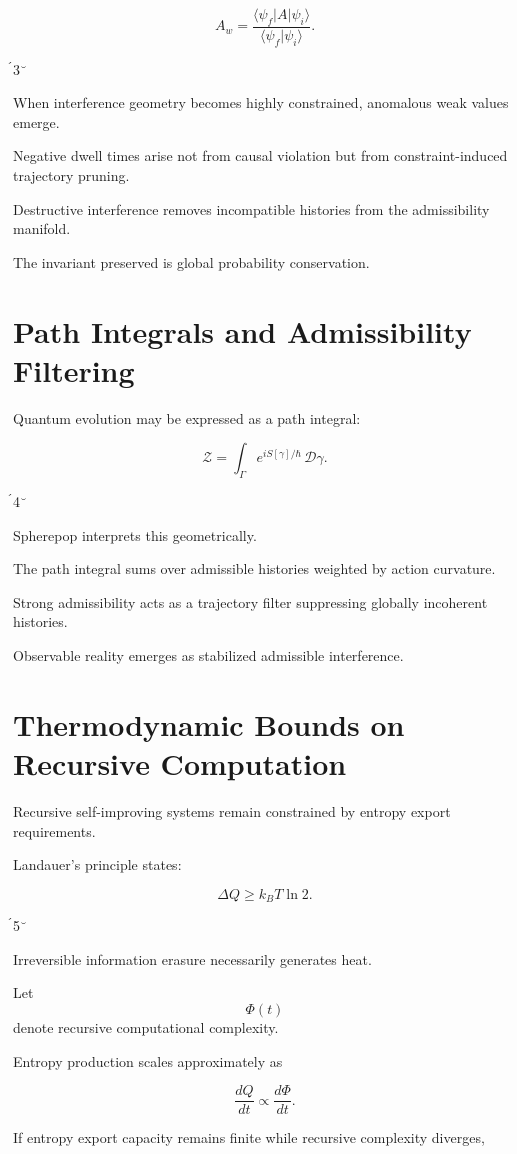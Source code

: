 \documentclass[12pt,openany]{book}
\theoremstyle{plain}
\theoremstyle{definition}
\theoremstyle{remark}
\begin{document}
\[
A_w
=
\frac{
\langle\psi_f|A|\psi_i\rangle
}{
\langle\psi_f|\psi_i\rangle
}.
\]

3

When interference geometry becomes highly constrained,
anomalous weak values emerge.

Negative dwell times arise not from causal violation but from
constraint-induced trajectory pruning.

Destructive interference removes incompatible histories from the
admissibility manifold.

The invariant preserved is global probability conservation.

\section{Path Integrals and Admissibility Filtering}

Quantum evolution may be expressed as a path integral:

\[
\mathcal{Z}
=
\int_{\Gamma}
e^{iS[\gamma]/\hbar}
\,\mathcal{D}\gamma.
\]

4

Spherepop interprets this geometrically.

The path integral sums over admissible histories weighted by
action curvature.

Strong admissibility acts as a trajectory filter suppressing
globally incoherent histories.

Observable reality emerges as stabilized admissible interference.

\section{Thermodynamic Bounds on Recursive Computation}

Recursive self-improving systems remain constrained by entropy
export requirements.

Landauer's principle states:

\[
\Delta Q
\geq
k_B T \ln 2.
\]

5

Irreversible information erasure necessarily generates heat.

Let
\[
\Phi(t)
\]
denote recursive computational complexity.

Entropy production scales approximately as

\[
\frac{dQ}{dt}
\propto
\frac{d\Phi}{dt}.
\]

If entropy export capacity remains finite while recursive
complexity diverges,
\end{document}
